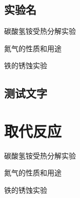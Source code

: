 \documentclass[color=orange,openany]{textbook-cn}
\begin{document}
\lipsum


\begin{Project}
\section{实验名}
\begin{Point}
\lipsum[2]
\end{Point}

\begin{Case}
\item 碳酸氢铵受热分解实验
\item 氮气的性质和用途
\item 铁的锈蚀实验
\end{Case}

\subsection{测试文字}
\lipsum
\begin{Definition}[定理名称]
\lipsum[2]
\end{Definition}

\begin{Application}
\lipsum[1-2]
\lipsum[3-4]
\end{Application}
\end{Project}


\section{取代反应}
\begin{Point}
\lipsum[2]
\end{Point}

\begin{Case}
\item 碳酸氢铵受热分解实验
\item 氮气的性质和用途
\item 铁的锈蚀实验
\end{Case}

\lipsum
\begin{Definition*}[定理名称定理名称定理名称定理名称定理名称定理名称]
\lipsum[2]
\end{Definition*}

\begin{Definition*}[定理名称]
\lipsum[2]
\end{Definition*}

\begin{Lemma}[引理名称]
\lipsum[2]
\end{Lemma}
\end{document}
